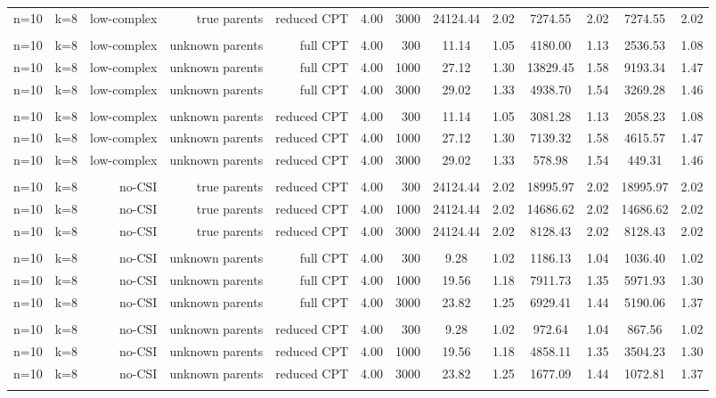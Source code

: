 \begin{table}[ht]
\begin{tabular}{rrrrrrr|cc|cc|cc}
  n=10 & k=8 & low-complex & true parents & reduced CPT & 4.00 & 3000 & 24124.44 & 2.02 & 7274.55 & 2.02 & 7274.55 & 2.02 \\ 
   \\ 
n=10 & k=8 & low-complex & unknown parents & full CPT & 4.00 & 300 & 11.14 & 1.05 & 4180.00 & 1.13 & 2536.53 & 1.08 \\ 
  n=10 & k=8 & low-complex & unknown parents & full CPT & 4.00 & 1000 & 27.12 & 1.30 & 13829.45 & 1.58 & 9193.34 & 1.47 \\ 
  n=10 & k=8 & low-complex & unknown parents & full CPT & 4.00 & 3000 & 29.02 & 1.33 & 4938.70 & 1.54 & 3269.28 & 1.46 \\ 
   \\ 
n=10 & k=8 & low-complex & unknown parents & reduced CPT & 4.00 & 300 & 11.14 & 1.05 & 3081.28 & 1.13 & 2058.23 & 1.08 \\ 
  n=10 & k=8 & low-complex & unknown parents & reduced CPT & 4.00 & 1000 & 27.12 & 1.30 & 7139.32 & 1.58 & 4615.57 & 1.47 \\ 
  n=10 & k=8 & low-complex & unknown parents & reduced CPT & 4.00 & 3000 & 29.02 & 1.33 & 578.98 & 1.54 & 449.31 & 1.46 \\ 
   \\ 
n=10 & k=8 & no-CSI & true parents & reduced CPT & 4.00 & 300 & 24124.44 & 2.02 & 18995.97 & 2.02 & 18995.97 & 2.02 \\ 
  n=10 & k=8 & no-CSI & true parents & reduced CPT & 4.00 & 1000 & 24124.44 & 2.02 & 14686.62 & 2.02 & 14686.62 & 2.02 \\ 
  n=10 & k=8 & no-CSI & true parents & reduced CPT & 4.00 & 3000 & 24124.44 & 2.02 & 8128.43 & 2.02 & 8128.43 & 2.02 \\ 
   \\ 
n=10 & k=8 & no-CSI & unknown parents & full CPT & 4.00 & 300 & 9.28 & 1.02 & 1186.13 & 1.04 & 1036.40 & 1.02 \\ 
  n=10 & k=8 & no-CSI & unknown parents & full CPT & 4.00 & 1000 & 19.56 & 1.18 & 7911.73 & 1.35 & 5971.93 & 1.30 \\ 
  n=10 & k=8 & no-CSI & unknown parents & full CPT & 4.00 & 3000 & 23.82 & 1.25 & 6929.41 & 1.44 & 5190.06 & 1.37 \\ 
   \\ 
n=10 & k=8 & no-CSI & unknown parents & reduced CPT & 4.00 & 300 & 9.28 & 1.02 & 972.64 & 1.04 & 867.56 & 1.02 \\ 
  n=10 & k=8 & no-CSI & unknown parents & reduced CPT & 4.00 & 1000 & 19.56 & 1.18 & 4858.11 & 1.35 & 3504.23 & 1.30 \\ 
  n=10 & k=8 & no-CSI & unknown parents & reduced CPT & 4.00 & 3000 & 23.82 & 1.25 & 1677.09 & 1.44 & 1072.81 & 1.37 \\ 
   \bottomrule 
 \multicolumn{13}{l}{\scriptsize } 
 \end{tabular}
\end{table}
